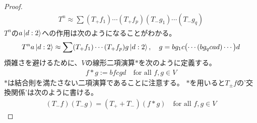 {\begin{proof}
		\begin{equation*}\begin{split}
			T^n \approx \sum (T_+f_1)\cdots(T_+f_p)(T_-g_1)\cdots(T_-g_q)
		\end{split}\end{equation*}
		$T^n$の$a\mathinner{|{d:2}\rangle}$への作用は次のようになることがわかる。
		\begin{equation*}\begin{split}
			T^n a\mathinner{|{d:2}\rangle} \approx \sum (T_+f_1)\cdots(T_+f_p) g\mathinner{|{d:2}\rangle},\quad
			g = bg_1c\bigl(\cdots(bg_qcad)\cdots\bigr)d
		\end{split}\end{equation*}
		煩雑さを避けるために、$V$の線形二項演算$*$を次のように定義する。
		\begin{equation*}\begin{split}
			f*g := bfcgd \quad\text{for all } f,g\in V
		\end{split}\end{equation*}
		$*$は結合則を満たさない二項演算であることに注意する。
		$*$を用いると$T_\pm f$の'交換関係'は次のように書ける。
		\begin{equation*}\begin{split}
			(T_-f)(T_-g) = (T_+ + T_-)(f*g) \quad\text{for all } f,g\in V
		\end{split}\end{equation*}


\end{proof}}
